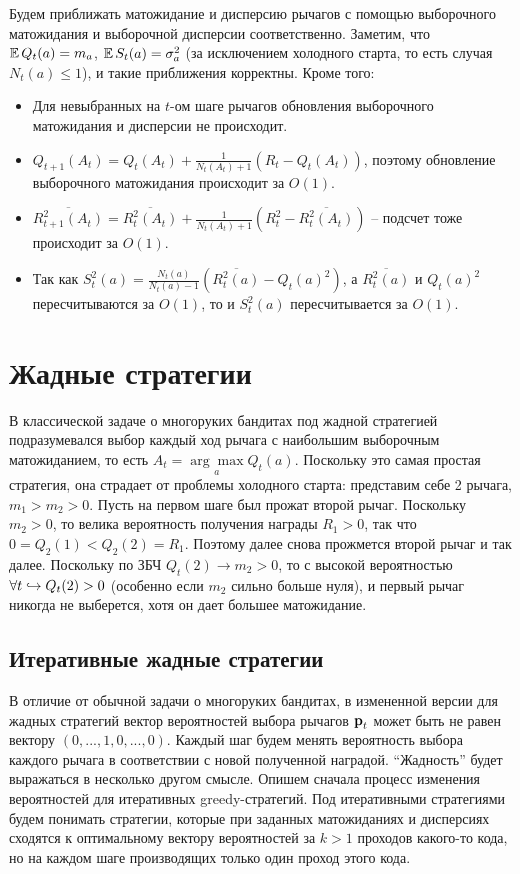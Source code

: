 Будем приближать матожидание и дисперсию рычагов с помощью выборочного матожидания и выборочной дисперсии соответственно. Заметим, что $\mathbb{E} \, Q_t(a) = m_a$, $\mathbb{E} \, S_t(a) = \sigma_a^2$ (за исключением холодного старта, то есть случая $N_t(a) \leq 1$), и такие приближения корректны. Кроме того:
\begin{itemize}
    \item Для невыбранных на $t$-ом шаге рычагов обновления выборочного матожидания и дисперсии не происходит.
    \item $Q_{t+1}(A_t) = Q_t(A_t) + \frac{1}{N_{t}(A_t) + 1}(R_t - Q_t(A_t))$, поэтому обновление выборочного матожидания происходит за $O(1)$.
    \item $\overline{R_{t+1}^2(A_t)} = \overline{R_t^2(A_t)} + \frac{1}{N_{t}(A_t) + 1}(R_t^2 - \overline{R_t^2(A_t)})$ -- подсчет тоже происходит за $O(1)$.
    \item Так как $S_t^2(a) = \frac{N_t(a)}{N_t(a) - 1}(\overline{R_t^2(a)} - Q_t(a)^2)$, а $\overline{R_t^2(a)}$ и $Q_t(a)^2$ пересчитываются за $O(1)$, то и $S_t^2(a)$ пересчитывается за $O(1)$.
\end{itemize}

\section{Жадные стратегии}

В классической задаче о многоруких бандитах под жадной стратегией подразумевался выбор каждый ход рычага с наибольшим выборочным матожиданием, то есть $A_t = \underset{a}{\arg \max} Q_t(a)$. Поскольку это самая простая стратегия, она страдает от проблемы холодного старта: представим себе 2 рычага, $m_1 > m_2 > 0$. Пусть на первом шаге был прожат второй рычаг. Поскольку $m_2 > 0$, то велика вероятность получения награды $R_1 > 0$, так что $0 = Q_2(1) < Q_2(2) = R_1$. Поэтому далее снова прожмется второй рычаг и так далее. Поскольку по ЗБЧ $Q_t(2) \to m_2 > 0$, то с высокой вероятностью $\forall t \hookrightarrow Q_t(2) > 0$ (особенно если $m_2$ сильно больше нуля), и первый рычаг никогда не выберется, хотя он дает большее матожидание. 

\subsection{Итеративные жадные стратегии}

В отличие от обычной задачи о многоруких бандитах, в измененной версии для жадных стратегий вектор вероятностей выбора рычагов $\textbf{p}_t$ может быть не равен вектору $(0, ..., 1, 0, ..., 0)$. Каждый шаг будем менять вероятность выбора каждого рычага в соответствии с новой полученной наградой. ``Жадность'' будет выражаться в несколько другом смысле. Опишем сначала процесс изменения вероятностей для итеративных greedy-стратегий. Под итеративными стратегиями будем понимать стратегии, которые при заданных матожиданиях и дисперсиях сходятся к оптимальному вектору вероятностей за $k > 1$ проходов какого-то кода, но на каждом шаге производящих только один проход этого кода.

